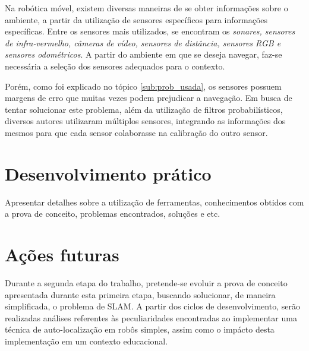 			Na robótica móvel, existem diversas maneiras de se obter informações sobre o ambiente, a partir da utilização de sensores específicos para informações específicas. Entre os sensores mais utilizados, se encontram os \textit{sonares, sensores de infra-vermelho, câmeras de vídeo, sensores de distância, sensores RGB e sensores odométricos}. A partir do ambiente em que se deseja navegar, faz-se necessária a seleção dos sensores adequados para o contexto.

			Porém, como foi explicado no tópico \ref{sub:prob_usada}, os sensores possuem margens de erro que muitas vezes podem prejudicar a navegação. Em busca de tentar solucionar este problema, além da utilização de filtros probabilísticos, diversos autores utilizaram múltiplos sensores, integrando as informações dos mesmos para que cada sensor colaborasse na calibração do outro sensor. 


\section{Desenvolvimento prático} %
\label{sec:desenvolvimento_prático}

	Apresentar detalhes sobre a utilização de ferramentas, conhecimentos obtidos com a prova de conceito, problemas encontrados, soluções e etc.

\section{Ações futuras} %
\label{sec:acoes_futuras}

	Durante a segunda etapa do trabalho, pretende-se evoluir a prova de conceito apresentada durante esta primeira etapa, buscando solucionar, de maneira simplificada, o problema de SLAM. A partir dos ciclos de desenvolvimento, serão realizadas análises referentes às peculiaridades encontradas ao implementar uma técnica de auto-localização em robôs simples, assim como o impácto desta implementação em um contexto educacional.

